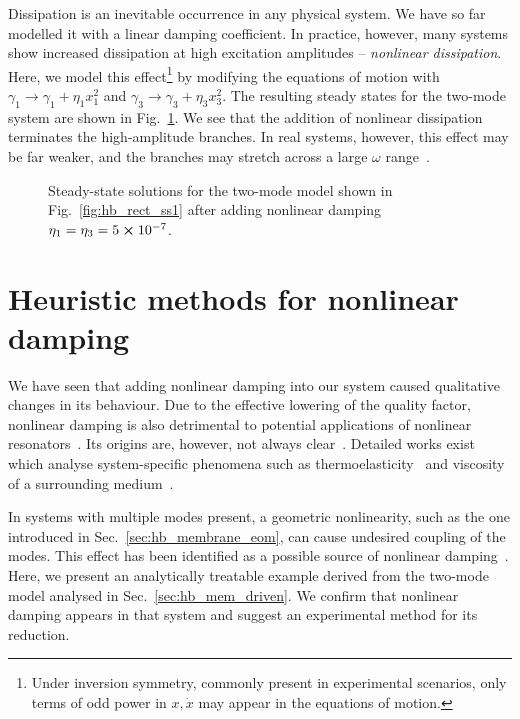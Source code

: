 Dissipation is an inevitable occurrence in any physical system. We have so far modelled it with a linear damping coefficient. In practice, however, many systems show increased dissipation at high excitation amplitudes -- \textit{nonlinear dissipation}. Here, we model this effect\footnote{Under inversion symmetry, commonly present in experimental scenarios, only terms of odd power in $x, \dot{x}$ may appear in the equations of motion.} by modifying the equations of motion with $\gamma_1 \rightarrow \gamma_1 + \eta_1 x_1^2$ and $\gamma_3 \rightarrow \gamma_3 + \eta_3 x_3^2$. The resulting steady states for the two-mode system are shown in Fig.~\ref{fig:hb_duff_nld}. We see that the addition of nonlinear dissipation terminates the high-amplitude branches. In real systems, however, this effect may be far weaker, and the branches may stretch across a large $\omega$ range~\cite{Yang_2021a}. 
\begin{figure} [h!]
	\centering
	
	\caption{Steady-state solutions for the two-mode model shown in Fig.~\ref{fig:hb_rect_ss1} after adding nonlinear damping $\eta_1 = \eta_3 = 5\cross 10^{-7}$.}
	\label{fig:hb_duff_nld}
\end{figure} 

\section{Heuristic methods for nonlinear damping}

We have seen that adding nonlinear damping into our system caused qualitative changes in its behaviour. Due to the effective lowering of the quality factor, nonlinear damping is also detrimental to potential applications of nonlinear resonators~\cite{Catalini_2021, Kosata_2020}. Its origins are, however, not always clear~\cite{Bachtold_2022, Steeneken_2021}. Detailed works exist which analyse system-specific phenomena such as thermoelasticity~\cite{Atalaya_2016, Cleland} and viscosity of a surrounding medium~\cite{Aureli_2010}. 

In systems with multiple modes present, a geometric nonlinearity, such as the one introduced in Sec.~\ref{sec:hb_membrane_eom}, can cause undesired coupling of the modes. This effect has been identified as a possible source of nonlinear damping~\cite{Kecskekler_2021, Guttinger2017, Dykman_1975}. Here, we present an analytically treatable example derived from the two-mode model analysed in Sec.~\ref{sec:hb_mem_driven}. We confirm that nonlinear damping appears in that system and suggest an experimental method for its reduction. 

